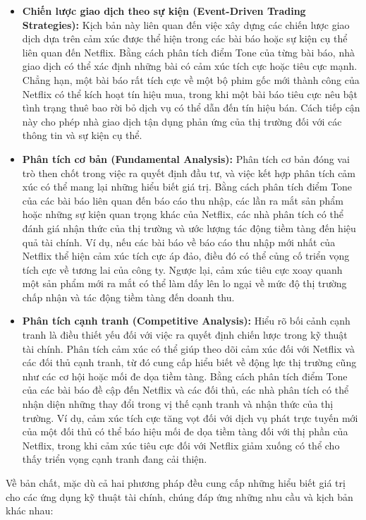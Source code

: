\begin{itemize}
\item
  \textbf{Chiến lược giao dịch theo sự kiện (Event-Driven Trading Strategies):} Kịch bản này liên quan đến việc xây dựng các chiến lược giao dịch dựa trên cảm xúc được thể hiện trong các bài báo hoặc sự kiện cụ thể liên quan đến Netflix. Bằng cách phân tích điểm Tone của từng bài báo, nhà giao dịch có thể xác định những bài có cảm xúc tích cực hoặc tiêu cực mạnh. Chẳng hạn, một bài báo rất tích cực về một bộ phim gốc mới thành công của Netflix có thể kích hoạt tín hiệu mua, trong khi một bài báo tiêu cực nêu bật tình trạng thuê bao rời bỏ dịch vụ có thể dẫn đến tín hiệu bán. Cách tiếp cận này cho phép nhà giao dịch tận dụng phản ứng của thị trường đối với các thông tin và sự kiện cụ thể.
\item
  \textbf{Phân tích cơ bản (Fundamental Analysis):} Phân tích cơ bản đóng vai trò then chốt trong việc ra quyết định đầu tư, và việc kết hợp phân tích cảm xúc có thể mang lại những hiểu biết giá trị. Bằng cách phân tích điểm Tone của các bài báo liên quan đến báo cáo thu nhập, các lần ra mắt sản phẩm hoặc những sự kiện quan trọng khác của Netflix, các nhà phân tích có thể đánh giá nhận thức của thị trường và ước lượng tác động tiềm tàng đến hiệu quả tài chính. Ví dụ, nếu các bài báo về báo cáo thu nhập mới nhất của Netflix thể hiện cảm xúc tích cực áp đảo, điều đó có thể củng cố triển vọng tích cực về tương lai của công ty. Ngược lại, cảm xúc tiêu cực xoay quanh một sản phẩm mới ra mắt có thể làm dấy lên lo ngại về mức độ thị trường chấp nhận và tác động tiềm tàng đến doanh thu.
\item
  \textbf{Phân tích cạnh tranh (Competitive Analysis):} Hiểu rõ bối cảnh cạnh tranh là điều thiết yếu đối với việc ra quyết định chiến lược trong kỹ thuật tài chính. Phân tích cảm xúc có thể giúp theo dõi cảm xúc đối với Netflix và các đối thủ cạnh tranh, từ đó cung cấp hiểu biết về động lực thị trường cũng như các cơ hội hoặc mối đe dọa tiềm tàng. Bằng cách phân tích điểm Tone của các bài báo đề cập đến Netflix và các đối thủ, các nhà phân tích có thể nhận diện những thay đổi trong vị thế cạnh tranh và nhận thức của thị trường. Ví dụ, cảm xúc tích cực tăng vọt đối với dịch vụ phát trực tuyến mới của một đối thủ có thể báo hiệu mối đe dọa tiềm tàng đối với thị phần của Netflix, trong khi cảm xúc tiêu cực đối với Netflix giảm xuống có thể cho thấy triển vọng cạnh tranh đang cải thiện.
\end{itemize}

Về bản chất, mặc dù cả hai phương pháp đều cung cấp những hiểu biết giá trị cho các ứng dụng kỹ thuật tài chính, chúng đáp ứng những nhu cầu và kịch bản khác nhau:

